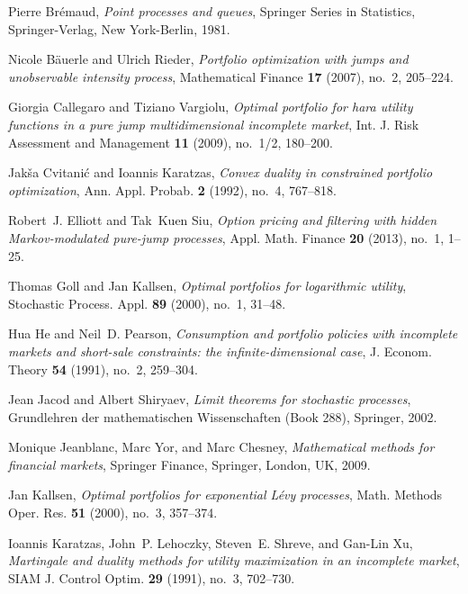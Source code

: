 \documentclass[11pt]{article}
\theoremstyle{plain}
\theoremstyle{definition}
\numberwithin{equation}{section}
\begin{document}
%

\begin{thebibliography}{10}

Pierre Br{\'e}maud, \emph{Point processes and queues}, Springer Series in
  Statistics, Springer-Verlag, New York-Berlin, 1981.

Nicole Bäuerle and Ulrich Rieder, \emph{Portfolio optimization with jumps and
  unobservable intensity process}, Mathematical Finance \textbf{17} (2007),
  no.~2, 205--224.

Giorgia Callegaro and Tiziano Vargiolu, \emph{Optimal portfolio for hara
  utility functions in a pure jump multidimensional incomplete market}, Int. J.
  Risk Assessment and Management \textbf{11} (2009), no.~1/2, 180--200.

Jak{\v{s}}a Cvitani{\'c} and Ioannis Karatzas, \emph{Convex duality in
  constrained portfolio optimization}, Ann. Appl. Probab. \textbf{2} (1992),
  no.~4, 767--818.

Robert~J. Elliott and Tak~Kuen Siu, \emph{Option pricing and filtering with
  hidden {M}arkov-modulated pure-jump processes}, Appl. Math. Finance
  \textbf{20} (2013), no.~1, 1--25.

Thomas Goll and Jan Kallsen, \emph{Optimal portfolios for logarithmic utility},
  Stochastic Process. Appl. \textbf{89} (2000), no.~1, 31--48.

Hua He and Neil~D. Pearson, \emph{Consumption and portfolio policies with
  incomplete markets and short-sale constraints: the infinite-dimensional
  case}, J. Econom. Theory \textbf{54} (1991), no.~2, 259--304.

Jean Jacod and Albert Shiryaev, \emph{Limit theorems for stochastic processes},
  Grundlehren der mathematischen Wissenschaften (Book 288), Springer, 2002.

Monique Jeanblanc, Marc Yor, and Marc Chesney, \emph{Mathematical methods for
  financial markets}, Springer Finance, Springer, London, UK, 2009.

Jan Kallsen, \emph{Optimal portfolios for exponential {L}\'evy processes},
  Math. Methods Oper. Res. \textbf{51} (2000), no.~3, 357--374.

Ioannis Karatzas, John~P. Lehoczky, Steven~E. Shreve, and Gan-Lin Xu,
  \emph{Martingale and duality methods for utility maximization in an
  incomplete market}, SIAM J. Control Optim. \textbf{29} (1991), no.~3,
  702--730.


\end{thebibliography}
\end{document}
